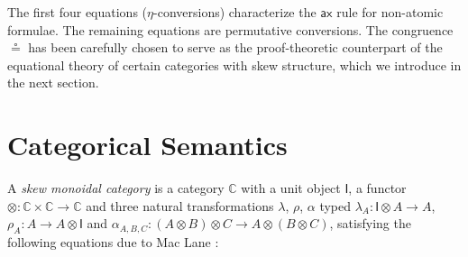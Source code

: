 \documentclass[submission,copyright,creativecommons]{eptcs}
\theoremstyle{definition}
\newcommand{\ax}{\mathsf{ax}}
\newcommand{\ot}{\otimes}
\newcommand{\lolli}{\multimap}
\newcommand{\I}{\mathsf{I}}
\begin{document}
The first four equations ($\eta$-conversions) characterize the $\ax$ rule for non-atomic formulae. The remaining equations are permutative conversions. The congruence $\circeq$ has been carefully chosen to serve as the proof-theoretic counterpart of the equational theory of certain categories with skew structure, which we introduce in the next section.

\section{Categorical Semantics}\label{sec:categorical}
  A \emph{skew monoidal category} \cite{szlachanyi:skew-monoidal:2012,lack:skew:2012,lack:triangulations:2014} is a category $\mathbb{C}$ with a unit object $\I$, a functor $\ot : \mathbb{C} \times \mathbb{C} \rightarrow \mathbb{C}$
and three natural transformations $\lambda$, $\rho$, $\alpha$ typed
  $\lambda_A : \I \ot A \to A$, $\rho_A : A \to A \ot \I$ and $\alpha_{A,B,C} : (A \ot B) \ot C \to A \ot (B \ot C)$,
satisfying the following equations due to Mac Lane \cite{maclane1963natural}:
\end{document}
